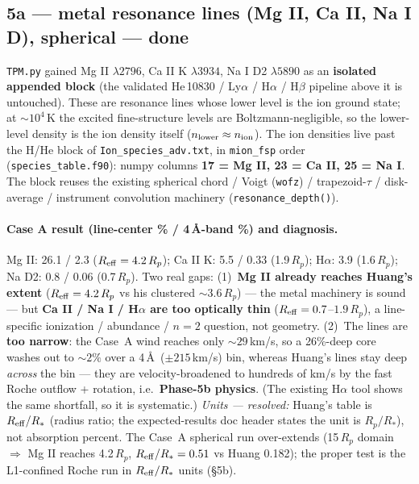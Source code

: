 \documentclass[english,a4paper]{kiseon_memo}
\begin{document}
\subsection{5a --- metal resonance lines (Mg II, Ca II, Na I D), spherical --- done}
\texttt{TPM.py} gained Mg II \(\lambda2796\), Ca II K \(\lambda3934\), Na I D2 \(\lambda5890\)
as an \textbf{isolated appended block} (the validated He\,10830 / Ly\(\alpha\) / H\(\alpha\) /
H\(\beta\) pipeline above it is untouched). These are resonance lines whose lower level is the
ion ground state; at \(\sim10^4\)\,K the excited fine-structure levels are
Boltzmann-negligible, so the lower-level density is the ion density itself
(\(n_{\rm lower}\approx n_{\rm ion}\)). The ion densities live past the H/He block of
\texttt{Ion\_species\_adv.txt}, in \texttt{mion\_fsp} order (\texttt{species\_table.f90}):
numpy columns \textbf{17 = Mg II, 23 = Ca II, 25 = Na I}. The block reuses the existing
spherical chord / Voigt (\texttt{wofz}) / trapezoid-\(\tau\) / disk-average / instrument
convolution machinery (\texttt{resonance\_depth()}).

\paragraph{Case A result (line-center \% / 4\,\AA-band \%) and diagnosis.}
Mg II: 26.1 / 2.3 (\(R_{\rm eff}=4.2\,R_p\)); Ca II K: 5.5 / 0.33 (1.9\,\(R_p\)); H\(\alpha\):
3.9 (1.6\,\(R_p\)); Na D2: 0.8 / 0.06 (0.7\,\(R_p\)). Two real gaps: (1)~\textbf{Mg II already
reaches Huang's extent} (\(R_{\rm eff}=4.2\,R_p\) vs his clustered \(\sim3.6\,R_p\)) --- the
metal machinery is sound --- but \textbf{Ca II / Na I / H\(\alpha\) are too optically thin}
(\(R_{\rm eff}=0.7\)--\(1.9\,R_p\)), a line-specific ionization / abundance / \(n=2\) question,
not geometry. (2)~The lines are \textbf{too narrow}: the Case~A wind reaches only
\(\sim29\)\,km/s, so a 26\%-deep core washes out to \(\sim2\%\) over a 4\,\AA\
(\(\pm215\)\,km/s) bin, whereas Huang's lines stay deep \emph{across} the bin --- they are
velocity-broadened to hundreds of km/s by the fast Roche outflow + rotation, i.e.\
\textbf{Phase-5b physics}. (The existing H\(\alpha\) tool shows the same shortfall, so it is
systematic.) \emph{Units --- resolved:} Huang's table is \(R_{\rm eff}/R_*\) (radius ratio;
the expected-results doc header states the unit is \(R_p/R_*\)), not absorption percent. The Case~A spherical run
over-extends (15\,\(R_p\) domain \(\Rightarrow\) Mg II reaches 4.2\,\(R_p\),
\(R_{\rm eff}/R_*=0.51\) vs Huang 0.182); the proper test is the L1-confined Roche run in
\(R_{\rm eff}/R_*\) units (\S5b).
\end{document}
